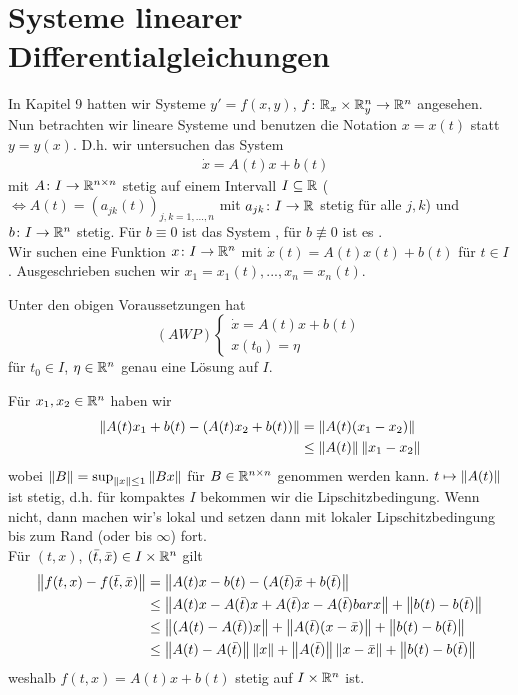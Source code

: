 \chapter{Systeme linearer Differentialgleichungen}
In Kapitel 9 hatten wir Systeme $ y'=f(x,y) $, $ f\colon\mathbb{R}_x\times\mathbb{R}_y^n\rightarrow\mathbb{R}^n $ angesehen. Nun betrachten wir lineare Systeme und benutzen die Notation $ x=x(t) $ statt $ y=y(x) $. D.h. wir untersuchen das System \begin{align*}
&\dot x=A(t)x+b(t)
\end{align*}
mit $ A\colon I\rightarrow\mathbb{R}^{n\times n} $ stetig auf einem Intervall $ I\subseteq\mathbb{R} $  ($ \Leftrightarrow A(t)=(a_{jk}(t))_{j,k=1,...,n} $ mit $ a_{jk}\colon I\rightarrow\mathbb{R} $ stetig f\"ur alle $ j,k $) und $ b\colon I\rightarrow\mathbb{R}^n $ stetig. F\"ur $ b\equiv 0 $ ist das System , f\"ur $ b\not\equiv 0$ ist es .\\
Wir suchen eine Funktion $ x\colon I\rightarrow\mathbb{R}^n $ mit $ \dot x(t)=A(t)x(t)+b(t) $ f\"ur $ t\in I $. Ausgeschrieben suchen wir $ x_1=x_1(t),...,x_n=x_n(t) $.
\begin{satz}
	Unter den obigen Voraussetzungen hat 
	\[ (AWP)\begin{cases}
	\dot x=A(t)x+b(t)\\ x(t_0)=\eta
	\end{cases} \]
	f\"ur $ t_0\in I $, $ \eta\in\mathbb{R}^n $ genau eine L\"osung auf $ I $.
\end{satz} 
\begin{beweis}
	F\"ur $ x_1,x_2\in\mathbb{R}^n $ haben wir
	\begin{align*}
	\left\|A(t)x_1+b(t)-(A(t)x_2+b(t))\right\|&=\left\|A(t)(x_1-x_2)\right\|\\
	&\leq\left\|A(t)\right\|\left\|x_1-x_2\right\|
	\end{align*}
	wobei $ \left\|B\right\|=\sup_{\left\|x\right\|\leq 1}\left\|Bx\right\| $ f\"ur $ B\in\mathbb{R}^{n\times n} $ genommen werden kann. $ t\mapsto\left\|A(t)\right\| $ ist stetig, d.h. f\"ur kompaktes $ I $ bekommen wir die Lipschitzbedingung. Wenn nicht, dann machen wir's lokal und setzen dann mit lokaler Lipschitzbedingung bis zum Rand (oder bis $ \infty $) fort.\\
	F\"ur $ (t,x) $, $ (\bar t,\bar x)\in I\times\mathbb{R}^n $ gilt 
	\begin{align*} \left\|f(t,x)-f(\bar t,\bar x)\right\|&=\left\|A(t)x-b(t)-(A(\bar t)\bar x+b(\bar t)\right\|\\&\leq\left\|A(t)x-A(\bar t)x+A(\bar t)x-A(\bar t)bar x\right\|+\left\|b(t)-b(\bar t)\right\|\\&\leq\left\|(A(t)-A(\bar t))x\right\|+\left\|A(\bar t)(x-\bar x)\right\|+\left\|b(t)-b(\bar t)\right\|\\&
	\leq\left\|A(t)-A(\bar t)\right\|\left\|x\right\|+\left\|A(\bar t)\right\|\left\|x-\bar x\right\|+\left\|b(t)-b(\bar t)\right\| \end{align*}
	weshalb $ f(t,x)=A(t)x+b(t) $ stetig auf $ I\times\mathbb{R}^n $ ist.
\end{beweis}

